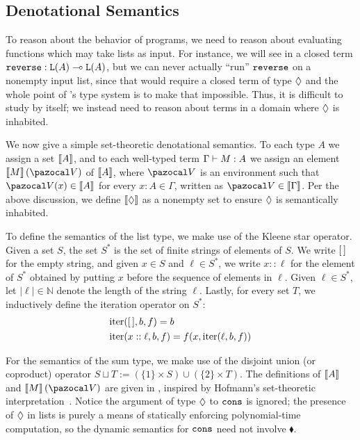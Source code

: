 \subsection{Denotational Semantics}
\label{sec:denotational-semantics}

To reason about the behavior of \lfpl programs, we need to reason about evaluating functions which may take lists as input. For instance, we will see in  a closed \lfpl term $\code{reverse} : \tparr{\tplist{A}}{\tplist{A}}$, but we can never actually ``run'' $\mathtt{reverse}$ on a nonempty input list, since that would require a closed term of type $\tpdiam$ and the whole point of \lfpl's type system is to make that impossible. Thus, it is difficult to study \lfpl by itself; we instead need to reason about terms in a domain where $\tpdiam$ is inhabited.

\enlargethispage{\baselineskip}
We now give a simple set-theoretic denotational semantics. To each type $A$ we assign a set $\llbracket A \rrbracket$, and to each well-typed term $\Gamma \vdash M : A$ we assign an element $\tmsem{M}{\env}$ of $\llbracket A \rrbracket$, where $\env$ is an environment such that $\env(x) \in \tpsem{A}$ for every $x : A \in \Gamma$, written as $\env \in \tpsem{\Gamma}$. Per the above discussion, we define $\tpsem{\tpdiam}$ as a nonempty set to ensure $\tpdiam$ is semantically inhabited.

To define the semantics of the \lfpl list type, we make use of the Kleene star operator. Given a set $S$, the set $S^*$ is the set of finite strings of elements of $S$. We write $[ \, ]$ for the empty string, and given $x \in S$ and $\ell \in S^*$, we write $x :: \ell$ for the element of $S^*$ obtained by putting $x$ before the sequence of elements in $\ell$. Given $\ell \in S^*$, let $|\ell| \in \mathbb N$ denote the length of the string $\ell$. Lastly, for every set $T$, we inductively define the iteration operator on $S^*$:
\begin{align*}
&\text{iter}([ \, ], b, f) = b \\
&\text{iter}(x :: \ell, b, f) = f(x, \text{iter}(\ell, b, f))
\end{align*}

For the semantics of the sum type, we make use of the disjoint union (or coproduct) operator $S \sqcup T := (\{ 1 \} \times S) \cup (\{ 2 \} \times T)$. The definitions of $\llbracket A \rrbracket$ and $\tmsem{M}{\env}$ are given in , inspired by Hofmann's set-theoretic interpretation~\cite{hofmannStrengthNonsizeIncreasing2002}. Notice the argument of type $\tpdiam$ to $\mathtt{cons}$ is ignored; the presence of $\tpdiam$ in lists is purely a means of statically enforcing polynomial-time computation, so the dynamic semantics for $\mathtt{cons}$ need not involve $\blacklozenge$.

